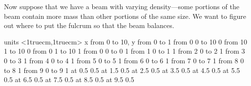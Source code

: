 Now suppose that we have a beam with varying density---some portions
of the beam contain more mass than other portions of the same size. We
want to figure out where to put the fulcrum so that the beam balances.

\figure
\vbox{\beginpicture
\normalgraphs
\ninepoint
\setcoordinatesystem units <1truecm,1truecm>
\setplotarea x from 0 to 10, y from 0 to 1
\putrule from 0 0 to 10 0
\putrule from 10 1 to 10 0
\putrule from 0 1 to 10 1
\putrule from 0 0 to 0 1
\putrule from 1 0 to 1 1
\putrule from 2 0 to 2 1
\putrule from 3 0 to 3 1
\putrule from 4 0 to 4 1
\putrule from 5 0 to 5 1
\putrule from 6 0 to 6 1
\putrule from 7 0 to 7 1
\putrule from 8 0 to 8 1
\putrule from 9 0 to 9 1
 at 0.5 0.5
 at 1.5 0.5
 at 2.5 0.5
 at 3.5 0.5
 at 4.5 0.5
 at 5.5 0.5
 at 6.5 0.5
 at 7.5 0.5
 at 8.5 0.5
 at 9.5 0.5
\endpicture}

